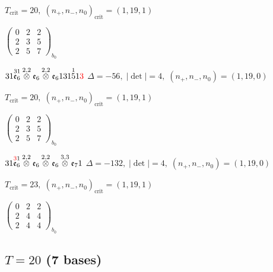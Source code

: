 \documentclass[10pt]{article}
\begin{document}
\hspace{1em}$T_{\text{crit}}=20,\; (n_+,n_-,n_0)_{\text{crit}}=(1,19,1)$

\hspace{2em}$\left(\begin{smallmatrix}0 & 2 & 2 \\ 2 & 3 & 5 \\ 2 & 5 & 7\end{smallmatrix}\right)_{\!b_0}$

\smallskip

$31\overset{31}{\mathfrak{e}_6}\overset{2,2}{\otimes}\mathfrak{e}_6\overset{2,2}{\otimes}\mathfrak{e}_6131\overset{1}{5}1\textcolor{red}{3}$ \quad $\Delta=-56,\; |\det|=4,\; (n_+,n_-,n_0)=(1,19,0)$

\hspace{1em}$T_{\text{crit}}=20,\; (n_+,n_-,n_0)_{\text{crit}}=(1,19,1)$

\hspace{2em}$\left(\begin{smallmatrix}0 & 2 & 2 \\ 2 & 3 & 5 \\ 2 & 5 & 7\end{smallmatrix}\right)_{\!b_0}$

\smallskip

$31\overset{\textcolor{red}{3}1}{\mathfrak{e}_6}\overset{2,2}{\otimes}\mathfrak{e}_6\overset{2,2}{\otimes}\mathfrak{e}_6\overset{3,3}{\otimes}\mathfrak{e}_71$ \quad $\Delta=-132,\; |\det|=4,\; (n_+,n_-,n_0)=(1,19,0)$

\hspace{1em}$T_{\text{crit}}=23,\; (n_+,n_-,n_0)_{\text{crit}}=(1,19,1)$

\hspace{2em}$\left(\begin{smallmatrix}0 & 2 & 2 \\ 2 & 4 & 4 \\ 2 & 4 & 4\end{smallmatrix}\right)_{\!b_0}$


\subsection*{$T = 20$ \quad (7 bases)}
\smallskip
\end{document}

